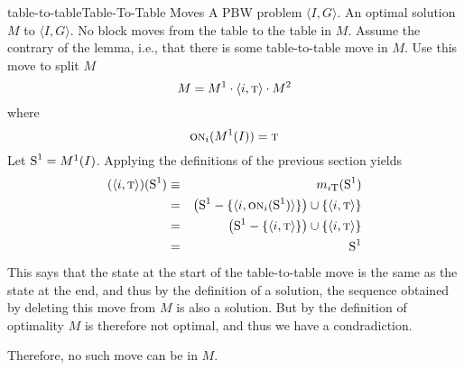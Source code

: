 \documentclass{article}
\newcommand{\bstate}{{\mbox{\cal S}}}
\newcommand{\tabtop}{{\mbox{\sc t}}}
\newcommand{\bon}{{\mbox{\sc on}}}
\begin{document}
\begin{lemma}{table-to-table}{Table-To-Table Moves}
\given
A PBW problem $\langle I, G \rangle$.
An optimal solution $M$ to $\langle I, G \rangle$.
\prove
No block moves from the table to the table in $M$.
\proof
Assume the contrary of the lemma, i.e., that there is
some table-to-table move in $M$.
Use this move to split $M$ 
$$
  M = M^1 \cdot \langle i, \tabtop \rangle \cdot M^2
$$
where $$
  \bon_i(M^1(I)) = \tabtop
$$
Let $\bstate^1 = M^1(I)$.
Applying the definitions of the previous section yields
\begin{eqnarray*}
  (\langle i, \tabtop \rangle)(\bstate^1)
  &\equiv& m_{i \tabtop}(\bstate^1) \\
  &=& \left ( \bstate^1 - \{ \langle i, \bon_i(\bstate^1) \rangle \} \right )
  \cup \{ \langle i, \tabtop \rangle \} \\
  &=& \left ( \bstate^1 - \{ \langle i, \tabtop \rangle \} \right )
  \cup \{ \langle i, \tabtop \rangle \} \\
  &=& \bstate^1
\end{eqnarray*}
This says that the state at the start of the table-to-table
move is the same as the state at the end, and thus by the
definition of a solution, the sequence obtained by deleting
this move from $M$ is also a solution.  But by the definition
of optimality $M$ is therefore not optimal, and thus we have
a condradiction.

Therefore, no such move can be in $M$.
\end{lemma}
\end{document}
